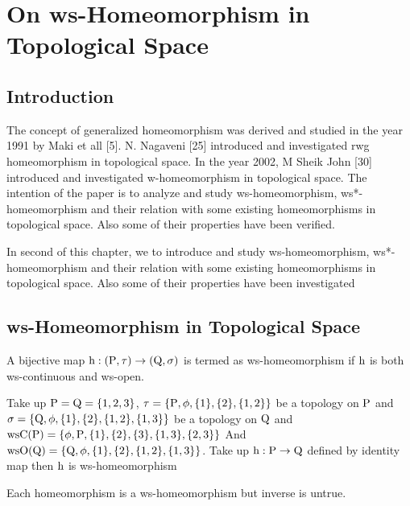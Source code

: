 \chapter{On ws-Homeomorphism in Topological Space}
\graphicspath{{Chapter5/Chapter5Figs/EPS/}{Chapter5/Chapter5Figs/}}

\section{Introduction}\label{sec5.1}

The concept of generalized homeomorphism was derived and studied in the year 1991 by Maki et all [5]. N. Nagaveni [25] introduced and investigated rwg homeomorphism in topological space. In the year 2002, M Sheik John [30] introduced and investigated w-homeomorphism in topological space. The intention of the paper is to analyze and study ws-homeomorphism, ws*-homeomorphism and their relation with some existing homeomorphisms in topological space. Also some of their properties have been verified.

In second of this chapter, we to introduce and study ws-homeomorphism, ws*-homeomorphism and their relation with some existing homeomorphisms in topological space. Also some of their properties have been investigated

\section{ws-Homeomorphism in Topological Space}\label{sec5.2}

\begin{dfn}\label{defi5.2.1}
A bijective map $\mathrm{h}: (\mathrm{P},\tau)\to (\mathrm{Q},\sigma)$ is termed as ws-homeomor\-phism if $\mathrm{h}$ is both ws-continuous and ws-open.
\end{dfn}

\begin{exm}\label{exam5.2.2} 
Take up $\mathrm{P}=\mathrm{Q}=\{1,2,3\}$, $\tau =\{\mathrm{P}, \phi,\{1\},\{2\},\{1,2\}\}$ be a topology on $\mathrm{P}$ and $\sigma =\{\mathrm{Q},\phi,\{1\},\{2\},\{1,2\},\{1,3\}\}$ be a topology on $\mathrm{Q}$ and $\mathrm{ws}\mathrm{C}(\mathrm{P})= \{\phi, \mathrm{P}, \{1\}, \{2\},\{3\}, \{1, 3\},\{2, 3\}\}$ And $\mathrm{ws}\mathrm{O}(\mathrm{Q}) =\{\mathrm{Q}, \phi,\{1\},\{2\},\{1,2\},\{1,3\}\}$. Take up $\mathrm{h}: \mathrm{P}\to \mathrm{Q}$ defined by identity map then $\mathrm{h}$ is ws-homeomorphism 
\end{exm}

\begin{thm}\label{thm5.2.3}
Each homeomorphism is a ws-homeomorphism but inverse is untrue.
\end{thm}

